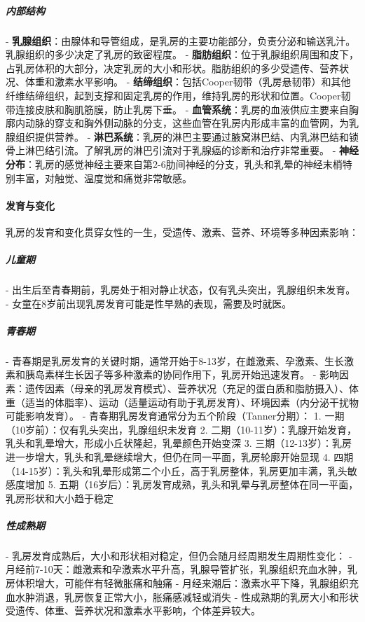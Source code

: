 \begin{enumerate}
\subparagraph{内部结构}
- \textbf{乳腺组织}：由腺体和导管组成，是乳房的主要功能部分，负责分泌和输送乳汁。乳腺组织的多少决定了乳房的致密程度。
- \textbf{脂肪组织}：位于乳腺组织周围和皮下，占乳房体积的大部分，决定乳房的大小和形状。脂肪组织的多少受遗传、营养状况、体重和激素水平影响。
- \textbf{结缔组织}：包括Cooper韧带（乳房悬韧带）和其他纤维结缔组织，起到支撑和固定乳房的作用，维持乳房的形状和位置。Cooper韧带连接皮肤和胸肌筋膜，防止乳房下垂。
- \textbf{血管系统}：乳房的血液供应主要来自胸廓内动脉的穿支和胸外侧动脉的分支，这些血管在乳房内形成丰富的血管网，为乳腺组织提供营养。
- \textbf{淋巴系统}：乳房的淋巴主要通过腋窝淋巴结、内乳淋巴结和锁骨上淋巴结引流。了解乳房的淋巴引流对于乳腺癌的诊断和治疗非常重要。
- \textbf{神经分布}：乳房的感觉神经主要来自第2-6肋间神经的分支，乳头和乳晕的神经末梢特别丰富，对触觉、温度觉和痛觉非常敏感。

\paragraph{发育与变化}

乳房的发育和变化贯穿女性的一生，受遗传、激素、营养、环境等多种因素影响：

\subparagraph{儿童期}
- 出生后至青春期前，乳房处于相对静止状态，仅有乳头突出，乳腺组织未发育。
- 女童在8岁前出现乳房发育可能是性早熟的表现，需要及时就医。

\subparagraph{青春期}
- 青春期是乳房发育的关键时期，通常开始于8-13岁，在雌激素、孕激素、生长激素和胰岛素样生长因子等多种激素的协同作用下，乳房开始迅速发育。
- 影响因素：遗传因素（母亲的乳房发育模式）、营养状况（充足的蛋白质和脂肪摄入）、体重（适当的体脂率）、运动（适量运动有助于乳房发育）、环境因素（内分泌干扰物可能影响发育）。
- 青春期乳房发育通常分为五个阶段（Tanner分期）：
  1. 一期（10岁前）：仅有乳头突出，乳腺组织未发育
  2. 二期（10-11岁）：乳腺开始发育，乳头和乳晕增大，形成小丘状隆起，乳晕颜色开始变深
  3. 三期（12-13岁）：乳房进一步增大，乳头和乳晕继续增大，但仍在同一平面，乳房轮廓开始显现
  4. 四期（14-15岁）：乳头和乳晕形成第二个小丘，高于乳房整体，乳房更加丰满，乳头敏感度增加
  5. 五期（16岁后）：乳房发育成熟，乳头和乳晕与乳房整体在同一平面，乳房形状和大小趋于稳定

\subparagraph{性成熟期}
- 乳房发育成熟后，大小和形状相对稳定，但仍会随月经周期发生周期性变化：
  - 月经前7-10天：雌激素和孕激素水平升高，乳腺导管扩张，乳腺组织充血水肿，乳房体积增大，可能伴有轻微胀痛和触痛
  - 月经来潮后：激素水平下降，乳腺组织充血水肿消退，乳房恢复正常大小，胀痛感减轻或消失
- 性成熟期的乳房大小和形状受遗传、体重、营养状况和激素水平影响，个体差异较大。


\end{enumerate}
